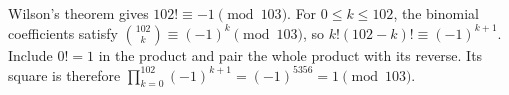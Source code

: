 Wilson's theorem gives $102!\equiv-1\pmod{103}$. For $0\le k\le102$, the binomial coefficients satisfy $\binom{102}{k}\equiv(-1)^k\pmod{103}$, so $k!(102-k)!\equiv(-1)^{k+1}$. Include $0!=1$ in the product and pair the whole product with its reverse. Its square is therefore $\prod_{k=0}^{102}(-1)^{k+1}=(-1)^{5356}=\boxed1\pmod{103}$.
